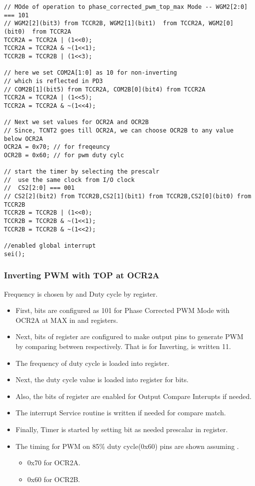 \begin{verbatim}
// MOde of operation to phase_corrected_pwm_top_max Mode -- WGM2[2:0] === 101
// WGM2[2](bit3) from TCCR2B, WGM2[1](bit1)  from TCCR2A, WGM2[0](bit0)  from TCCR2A
TCCR2A = TCCR2A | (1<<0);
TCCR2A = TCCR2A & ~(1<<1);
TCCR2B = TCCR2B | (1<<3);		

// here we set COM2A[1:0] as 10 for non-inverting
// which is reflected in PD3
// COM2B[1](bit5) from TCCR2A, COM2B[0](bit4) from TCCR2A
TCCR2A = TCCR2A | (1<<5);
TCCR2A = TCCR2A & ~(1<<4);
    
// Next we set values for OCR2A and OCR2B
// Since, TCNT2 goes till OCR2A, we can choose OCR2B to any value below OCR2A
OCR2A = 0x70; // for freqeuncy
OCR2B = 0x60; // for pwm duty cylc

// start the timer by selecting the prescalr
//  use the same clock from I/O clock
//  CS2[2:0] === 001
// CS2[2](bit2) from TCCR2B,CS2[1](bit1) from TCCR2B,CS2[0](bit0) from TCCR2B
TCCR2B = TCCR2B | (1<<0);
TCCR2B = TCCR2B & ~(1<<1);
TCCR2B = TCCR2B & ~(1<<2);

//enabled global interrupt
sei();
\end{verbatim}

\subsubsection{Inverting PWM with TOP at  OCR2A}
\quad Frequency is chosen by  and Duty cycle by  register.
\begin{itemize}
    \item First,  bits are configured as 101 for Phase Corrected PWM Mode with OCR2A at MAX in  and  registers.
    \item Next,   bits of  register are configured to make output  pins to generate PWM by comparing between  respectively. That is for Inverting,  is written 11.
    \item The frequency of duty cycle is loaded into  register.
    \item Next, the duty cycle value is loaded into  register for  bits.
    \item Also, the  bits of  register  are enabled for Output Compare Interupts if needed.
    \item The interrupt Service routine is written if needed for compare match.
    \item Finally, Timer is started by setting  bit as needed prescalar in  register.
    \item The timing for PWM on 85\% duty cycle(0x60)   pins are shown assuming .
    \begin{itemize}
        \item 0x70 for OCR2A.
        \item 0x60 for OCR2B.
    \end{itemize}
\end{itemize}

